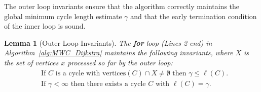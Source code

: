 \documentclass{article}
\newtheorem{lemma}{Lemma}
\begin{document}
The outer loop invariants ensure that the algorithm correctly maintains the global minimum cycle length estimate $\gamma$ and that the early termination condition of the inner loop is sound.

\begin{lemma}[Outer Loop Invariants]
\label{lem:outer}
The {\bf for} loop (Lines 2-end) in Algorithm~\ref{alg:MWC_Dijkstra} maintains the following invariants, where $X$ is the set of vertices $x$ processed so far by the outer loop:
\begin{align}
\label{eq:gamma-leq}
&\text{If } C \text{ is a cycle with } \text{vertices}(C) \cap X \neq \emptyset \text{ then } \gamma \leq \ell(C). \\
\label{eq:gamma-eq}
&\text{If } \gamma < \infty \text{ then there exists a cycle } C \text{ with } \ell(C) = \gamma.
\end{align}
\end{lemma}
\end{document}
